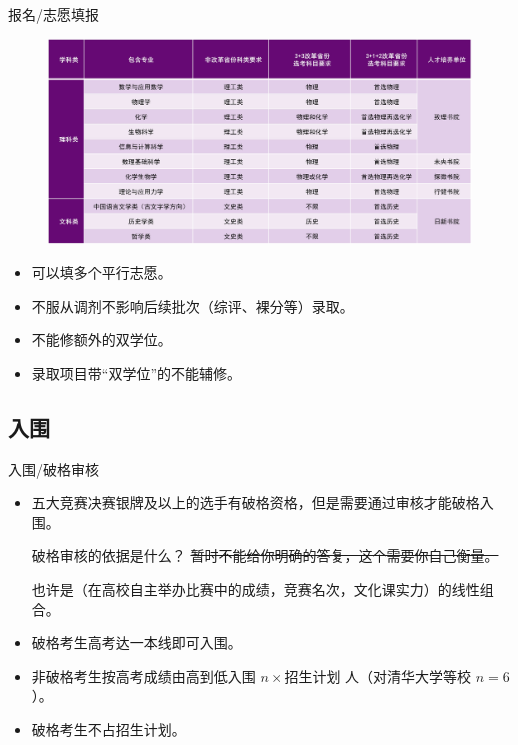 \documentclass{beamer}
\begin{document}
\begin{frame}{报名/志愿填报}
    \pause
    \begin{figure}[h!]
        \centering
        \includegraphics[width=0.7\linewidth]{majors.jpg}
        \label{fig:OH-majors}
    \end{figure}
    \begin{itemize}
        \pause
        \item 可以填多个平行志愿。
        \pause
        \item 不服从调剂不影响后续批次（综评、裸分等）录取。
        \pause
        \item 不能修额外的双学位。
        \pause
        \item 录取项目带“双学位”的不能辅修。
    \end{itemize}
\end{frame}

\subsection{入围}
\begin{frame}{入围/破格审核}
    \begin{itemize}
        \pause
        \item 五大竞赛决赛银牌及以上的选手有破格资格，但是需要通过审核才能破格入围。
        \pause
        \begin{exampleblock}{破格审核的依据是什么？}
        \sout{暂时不能给你明确的答复，这个需要你自己衡量。} \par
        \pause
        也许是（在高校自主举办比赛中的成绩，竞赛名次，文化课实力）的线性组合。
        \end{exampleblock}
        \pause
        \item 破格考生高考达一本线即可入围。
        \item 非破格考生按高考成绩由高到低入围 $n \times \text{招生计划}$ 人（对清华大学等校 $n = 6$）。
        \item 破格考生不占招生计划。
    \end{itemize}
\end{frame}
\end{document}

